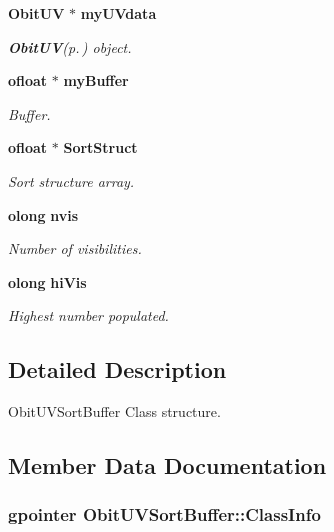 \begin{CompactItemize}
{\bf Obit\-UV} $\ast$ {\bf my\-UVdata}
\begin{CompactList}\small\item\em {\bf Obit\-UV}{\rm (p.\,\pageref{structObitUV})} object. \item\end{CompactList}\item 
{\bf ofloat} $\ast$ {\bf my\-Buffer}
\begin{CompactList}\small\item\em Buffer. \item\end{CompactList}\item 
{\bf ofloat} $\ast$ {\bf Sort\-Struct}
\begin{CompactList}\small\item\em Sort structure array. \item\end{CompactList}\item 
{\bf olong} {\bf nvis}
\begin{CompactList}\small\item\em Number of visibilities. \item\end{CompactList}\item 
{\bf olong} {\bf hi\-Vis}
\begin{CompactList}\small\item\em Highest number populated. \item\end{CompactList}\end{CompactItemize}


\subsection{Detailed Description}
Obit\-UVSort\-Buffer Class structure. 



\subsection{Member Data Documentation}
\subsubsection{\setlength{\rightskip}{0pt plus 5cm}gpointer {\bf Obit\-UVSort\-Buffer::Class\-Info}}\label{structObitUVSortBuffer_o1}


